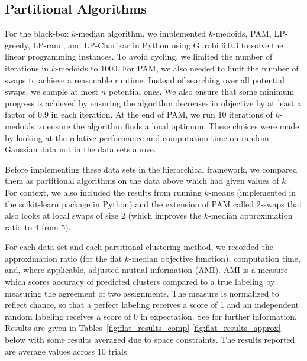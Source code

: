 \documentclass[conference, 10pt, final]{IEEEtran}
\begin{document}
\subsection{Partitional Algorithms}
 For the black-box $k$-median algorithm, we implemented $k$-medoids, PAM, LP-greedy, LP-rand, and LP-Charikar in Python using Gurobi 6.0.3 to solve the linear programming instances. 
To avoid cycling, we limited the number of iterations in $k$-medoids to 1000. For PAM, we also needed to limit the number of swaps to achieve a reasonable runtime. Instead of searching over all potential swaps, we sample at most $n$ potential ones. We also ensure that some minimum progress is achieved by ensuring the algorithm decreases in objective by at least a factor of 0.9 in each iteration. At the end of PAM, we run 10 iterations of $k$-medoids to ensure the algorithm finds a local optimum. These choices were made by looking at the relative performance and computation time on random Gaussian data not in the data sets above.

Before implementing these data sets in the hierarchical framework, we compared them as partitional algorithms on the data above which had given values of $k$. For context, we also included the results from running $k$-means (implemented in the scikit-learn package in Python) and the extension of PAM called 2-swaps that also looks at local swaps of size 2 (which improves the $k$-median approximation ratio to 4 from 5). 

For each data set and each partitional clustering method, we recorded the approximation ratio (for the flat $k$-median objective function), computation time, and, where applicable, adjusted mutual information (AMI).  AMI is a measure which scores accuracy of predicted clusters compared to a true labeling by measuring the agreement of two assignments. The measure is normalized to reflect chance, so that a perfect labeling receives a score of 1 and an independent random labeling receives a score of 0 in expectation.  See \cite{Vinh} for further information.  Results are given in Tables~\ref{fig:flat_results_comp}-\ref{fig:flat_results_approx}  below with some results averaged due to space constraints. The results reported are average values across 10 trials.
\end{document}
